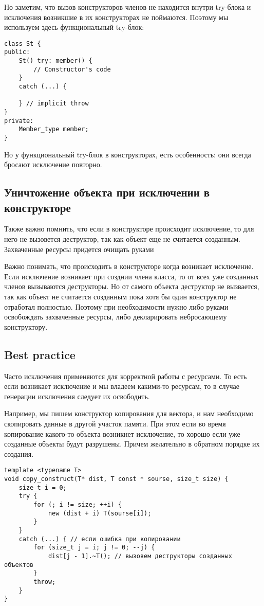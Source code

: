 Но заметим, что вызов конструкторов членов не находится внутри try-блока и исключения возникшие в их конструкторах не поймаются.
Поэтому мы используем здесь функциональный try-блок:

\begin{verbatim}
class St {
public:
    St() try: member() {
        // Constructor's code
    }
    catch (...) {

    } // implicit throw
}
private:
    Member_type member;
}
\end{verbatim}

Но у функциональный try-блок в конструкторах, есть особенность: они всегда бросают исключение повторно.

\subsection{Уничтожение объекта при исключении в конструкторе}

Также важно помнить, что если в конструкторе происходит исключение, то для него не вызовется деструктор, так как объект еще не считается созданным. Захваченные ресурсы придется очищать руками

Важно понимать, что происходить в конструкторе когда возникает исключение. Если исключение возникает при созднии члена класса, то от всех уже созданных членов вызываются деструкторы. Но от самого объекта деструктор не вызвается, так как объект не считается созданным пока хотя бы один конструктор не отработал полностью. Поэтому при необходимости нужно либо руками освобождать захваченные ресурсы, либо декларировать небросающему конструктору.

\subsection{Best practice}
Часто исключения применяются для корректной работы с ресурсами. То есть если возникает исключение и мы владеем какими-то ресурсам, то в случае генерации исключения следует их освободить.

Например, мы пишем конструктор копирования для вектора, и нам необходимо скопировать данные в другой участок памяти. При этом если во время копирование какого-то объекта возникнет исключение, то хорошо если уже созданные объекты будут разрушены. Причем желательно в обратном порядке их создания.
\begin{verbatim}
template <typename T>
void copy_construct(T* dist, T const * sourse, size_t size) {
    size_t i = 0;
    try {
        for (; i != size; ++i) {
            new (dist + i) T(sourse[i]);
        }
    }
    catch (...) { // если ошибка при копировании
        for (size_t j = i; j != 0; --j) {
            dist[j - 1].~T(); // вызовем деструкторы созданных объектов
        }
        throw;
    }
}
\end{verbatim}

